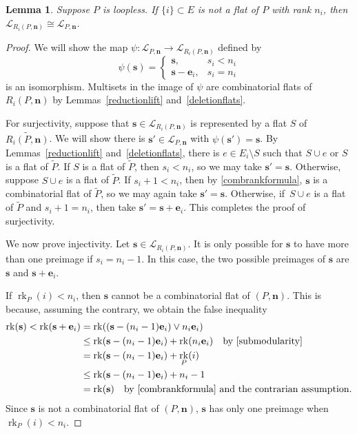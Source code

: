 \documentclass[11pt]{article}
\newtheorem{lemm}[theo]{Lemma}
\theoremstyle{definition}
\numberwithin{equation}{section}
\DeclareMathOperator{\rk}{rk}
\begin{document}
\begin{lemm}\label{reductioniso}
  Suppose $P$ is loopless.
If  $\{i\} \subset E$ is not a flat of $P$ with rank $n_i$, then $\mathcal L_{R_i(P, \mathbf n)} \cong \mathcal L_{P, \mathbf n}$.
\end{lemm}
\begin{proof}
  We will show the map $\psi: \mathcal L_{P, \mathbf n} \to \mathcal L_{R_i(P, \mathbf n)}$ defined by
  \[ \psi(\mathbf s) = \begin{cases}
    \mathbf s, & s_i < n_i \\
    \mathbf s - \mathbf e_i, & s_i = n_i
  \end{cases}
\]
is an isomorphism.
Multisets in the image of $\psi$ are combinatorial flats of $R_i(P, \mathbf n)$ by Lemmas~\ref{reductionlift} and~\ref{deletionflats}.

For surjectivity, suppose that $\mathbf s \in \mathcal L_{R_i(P, \mathbf n)}$ is represented by a flat $S$ of $\widetilde{R_i(P, \mathbf n)}$.
We will show there is $\mathbf s' \in \mathcal L_{P, \mathbf n}$ with $\psi(\mathbf s') = \mathbf s$.
By Lemmas~\ref{reductionlift} and~\ref{deletionflats},  there is $e \in E_i \setminus S$ such that $S \cup e$ or $S$ is a flat of $\widetilde P$.
If $S$ is a flat of $\widetilde P$, then $s_i < n_i$, so we may take $\mathbf s' = \mathbf s$.
Otherwise, suppose $S \cup e$ is a flat of $\widetilde P$.
If $s_i + 1 < n_i$, then by \cref{combrankformula}, $\mathbf s$ is a combinatorial flat of $\widetilde P$, so we may again take $\mathbf s' = \mathbf s$.
Otherwise, if~$S \cup e$ is a flat of $\widetilde P$ and $s_i + 1 = n_i$, then take $\mathbf s' = \mathbf s + \mathbf e_i$.
This completes the proof of surjectivity.


We now prove injectivity.
Let $\mathbf s \in \mathcal L_{R_i(P, \mathbf n)}$.
It is only possible for $\mathbf s$ to have more than one preimage if $s_i = n_i - 1$.
In this case, the two possible preimages of $\mathbf s$ are $\mathbf s$ and $\mathbf s + \mathbf e_i$.

If $\rk_P(i) < n_i$, then $\mathbf s$ cannot be a combinatorial flat of $(P, \mathbf n)$.
This is because, assuming the contrary, we obtain the false inequality
\begin{align*}
  \rk(\mathbf s) < \rk(\mathbf s + \mathbf e_i)
  &= \rk((\mathbf s - (n_i-1) \mathbf e_i) \vee n_i \mathbf e_i) \\
  &\leq \rk(\mathbf s - (n_i-1) \mathbf e_i) + \rk(n_i \mathbf e_i) \quad \text{by \cref{submodularity}}\\
  &= \rk(\mathbf s - (n_i-1) \mathbf e_i) + \rk_P(i) \\
  &\leq \rk(\mathbf s - (n_i-1) \mathbf e_i) + n_i - 1 \\
  & = \rk(\mathbf s) \quad \text{by \cref{combrankformula} and the contrarian assumption.}
\end{align*}
Since $\mathbf s$ is not a combinatorial flat of $(P, \mathbf n)$, $\mathbf s$ has only one preimage when $\rk_P(i) < n_i$.


\end{proof}
\end{document}
